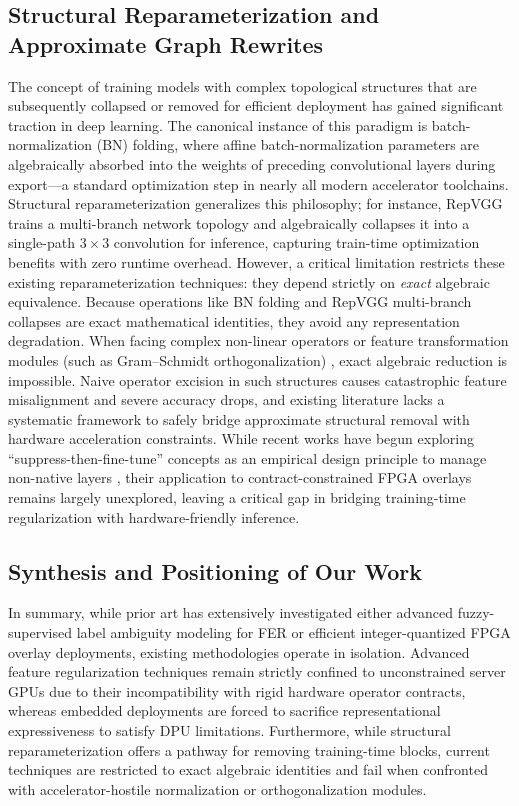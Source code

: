 \documentclass[algorithms,article,submit,moreauthors]{Definitions/mdpi}
\begin{document}
\subsection{Structural Reparameterization and Approximate Graph Rewrites}

The concept of training models with complex topological structures that are subsequently collapsed or removed for efficient deployment has gained significant traction in deep learning. The canonical instance of this paradigm is batch-normalization (BN) folding, where affine batch-normalization parameters are algebraically absorbed into the weights of preceding convolutional layers during export—a standard optimization step in nearly all modern accelerator toolchains. Structural reparameterization generalizes this philosophy; for instance, RepVGG \citep{bib16} trains a multi-branch network topology and algebraically collapses it into a single-path $3{\times}3$ convolution for inference, capturing train-time optimization benefits with zero runtime overhead. However, a critical limitation restricts these existing reparameterization techniques: they depend strictly on \emph{exact} algebraic equivalence. Because operations like BN folding and RepVGG multi-branch collapses are exact mathematical identities, they avoid any representation degradation. When facing complex non-linear operators or feature transformation modules (such as Gram--Schmidt orthogonalization) \citep{bibsoftortho}, exact algebraic reduction is impossible. Naive operator excision in such structures causes catastrophic feature misalignment and severe accuracy drops, and existing literature lacks a systematic framework to safely bridge approximate structural removal with hardware acceleration constraints. While recent works have begun exploring ``suppress-then-fine-tune'' concepts as an empirical design principle to manage non-native layers \citep{bib17}, their application to contract-constrained FPGA overlays remains largely unexplored, leaving a critical gap in bridging training-time regularization with hardware-friendly inference.

\subsection{Synthesis and Positioning of Our Work}

In summary, while prior art has extensively investigated either advanced fuzzy-supervised label ambiguity modeling for FER or efficient integer-quantized FPGA overlay deployments, existing methodologies operate in isolation. Advanced feature regularization techniques remain strictly confined to unconstrained server GPUs due to their incompatibility with rigid hardware operator contracts, whereas embedded deployments are forced to sacrifice representational expressiveness to satisfy DPU limitations. Furthermore, while structural reparameterization offers a pathway for removing training-time blocks, current techniques are restricted to exact algebraic identities and fail when confronted with accelerator-hostile normalization or orthogonalization modules. 
\end{document}
